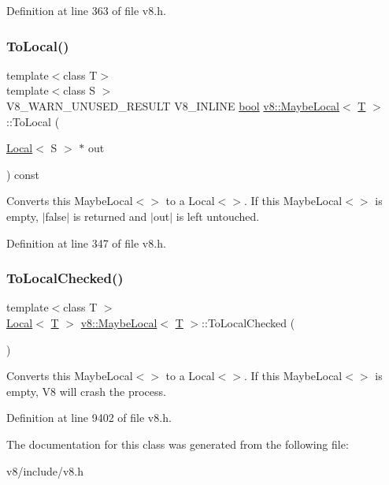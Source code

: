 Definition at line 363 of file v8.\+h.

\mbox{\label{classv8_1_1MaybeLocal_aa12fc83adccbf02f502a2aaeed9c32ab}} 
\subsubsection{\texorpdfstring{To\+Local()}{ToLocal()}}
{\footnotesize\ttfamily template$<$class T$>$ \\
template$<$class S $>$ \\
V8\+\_\+\+W\+A\+R\+N\+\_\+\+U\+N\+U\+S\+E\+D\+\_\+\+R\+E\+S\+U\+LT V8\+\_\+\+I\+N\+L\+I\+NE \mbox{\hyperlink{classbool}{bool}} \mbox{\hyperlink{classv8_1_1MaybeLocal}{v8\+::\+Maybe\+Local}}$<$ \mbox{\hyperlink{classv8_1_1internal_1_1torque_1_1T}{T}} $>$\+::To\+Local (\begin{DoxyParamCaption}\item[{\mbox{\hyperlink{classv8_1_1Local}{Local}}$<$ S $>$ $\ast$}]{out }\end{DoxyParamCaption}) const\hspace{0.3cm}{\ttfamily [inline]}}

Converts this Maybe\+Local$<$$>$ to a Local$<$$>$. If this Maybe\+Local$<$$>$ is empty, $\vert$false$\vert$ is returned and $\vert$out$\vert$ is left untouched. 

Definition at line 347 of file v8.\+h.

\mbox{\label{classv8_1_1MaybeLocal_a9b2c9d50fca5897e3a03fd4c25d12415}} 
\subsubsection{\texorpdfstring{To\+Local\+Checked()}{ToLocalChecked()}}
{\footnotesize\ttfamily template$<$class T $>$ \\
\mbox{\hyperlink{classv8_1_1Local}{Local}}$<$ \mbox{\hyperlink{classv8_1_1internal_1_1torque_1_1T}{T}} $>$ \mbox{\hyperlink{classv8_1_1MaybeLocal}{v8\+::\+Maybe\+Local}}$<$ \mbox{\hyperlink{classv8_1_1internal_1_1torque_1_1T}{T}} $>$\+::To\+Local\+Checked (\begin{DoxyParamCaption}{ }\end{DoxyParamCaption})}

Converts this Maybe\+Local$<$$>$ to a Local$<$$>$. If this Maybe\+Local$<$$>$ is empty, V8 will crash the process. 

Definition at line 9402 of file v8.\+h.



The documentation for this class was generated from the following file\+:\begin{DoxyCompactItemize}
\item 
v8/include/v8.\+h\end{DoxyCompactItemize}
